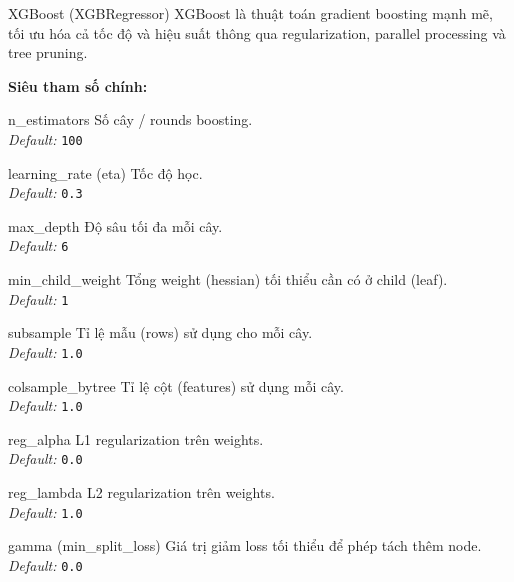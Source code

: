 \documentclass[12pt,a4paper]{article}
\newenvironment{methodlist}{
    \begin{description}[style=nextline, font=\ttfamily\color{sklearn-blue}]
}{
    \end{description}
}
\begin{document}
\begin{modelbox}{XGBoost (XGBRegressor)}
XGBoost là thuật toán gradient boosting mạnh mẽ, tối ưu hóa cả tốc độ và hiệu suất thông qua regularization, parallel processing và tree pruning.

\vspace{0.2cm}
\textbf{Siêu tham số chính:}
\begin{methodlist}
    \item[n\_estimators] 
    Số cây / rounds boosting. \\ 
    \textit{Default:} \texttt{100}
    
    \item[learning\_rate (eta)] 
    Tốc độ học. \\ 
    \textit{Default:} \texttt{0.3}
    
    \item[max\_depth] 
    Độ sâu tối đa mỗi cây. \\ 
    \textit{Default:} \texttt{6}
    
    \item[min\_child\_weight] 
    Tổng weight (hessian) tối thiểu cần có ở child (leaf). \\ 
    \textit{Default:} \texttt{1}
    
    \item[subsample] 
    Tỉ lệ mẫu (rows) sử dụng cho mỗi cây. \\ 
    \textit{Default:} \texttt{1.0}
    
    \item[colsample\_bytree] 
    Tỉ lệ cột (features) sử dụng mỗi cây. \\ 
    \textit{Default:} \texttt{1.0}
    
    \item[reg\_alpha] 
    L1 regularization trên weights. \\ 
    \textit{Default:} \texttt{0.0}
    
    \item[reg\_lambda] 
    L2 regularization trên weights. \\ 
    \textit{Default:} \texttt{1.0}
    
    \item[gamma (min\_split\_loss)] 
    Giá trị giảm loss tối thiểu để phép tách thêm node. \\ 
    \textit{Default:} \texttt{0.0}
\end{methodlist}
\end{modelbox}
\end{document}
